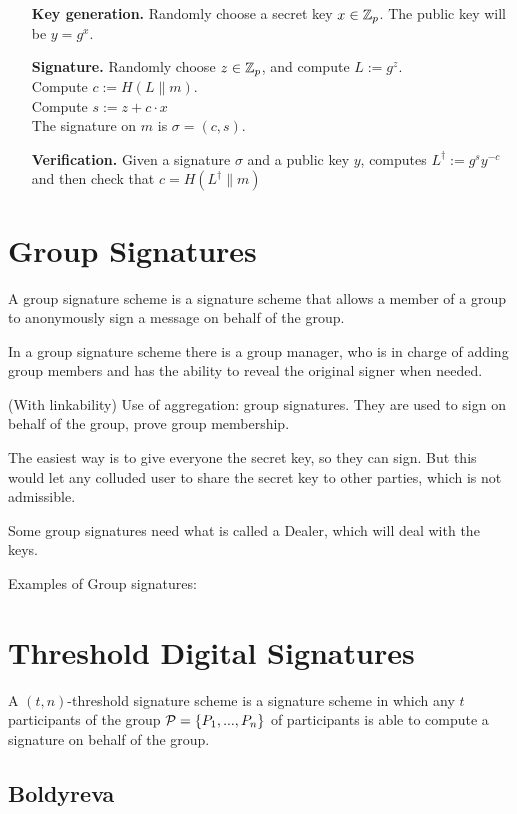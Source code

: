 \begin{itemize}[align = left, leftmargin=*]
	\item[\textbf{Key generation.}]	Randomly choose a secret key $x \in {\mathbb Z}_p$. The public key will be $y = g^x$.
	\item[\textbf{Signature.}] Randomly choose $z \in  {\mathbb Z}_p$, and compute $L := g^z$. \\
Compute $c := H(L \parallel m)$. \\
Compute $s := z + c \cdot x$ \\
The signature on $m$ is $\sigma = (c,s)$.
	\item[\textbf{Verification.}] Given a signature $\sigma$ and a public key $y$, computes $L^{\dagger} := g^{s} y^{-c}$ and then check that $c = H(L^{\dagger} \parallel m) $
\end{itemize}

\section{Group Signatures}
A group signature scheme is a signature scheme that allows a member of a group to anonymously sign a message on behalf of the group.

In a group signature scheme there is a group manager, who is in charge of adding group members and has the ability to reveal the original signer when needed.

(With linkability)
Use of aggregation: group signatures. They are used to sign on behalf of the group, prove group membership.

The easiest way is to give everyone the secret key, so they can sign. But this would let any colluded user to share the secret key to other parties, which is not admissible.

Some group signatures need what is called a Dealer, which will deal with the keys.

Examples of Group signatures:

\section{Threshold Digital Signatures}
A $(t,n)$-threshold signature scheme is a signature scheme in which any $t$ participants of the group ${\mathcal P} = \{P_1, ..., P_n \}$ of participants is able to compute a signature on behalf of the group.

\subsection{Boldyreva}
\label{sec:shamir_sig}

